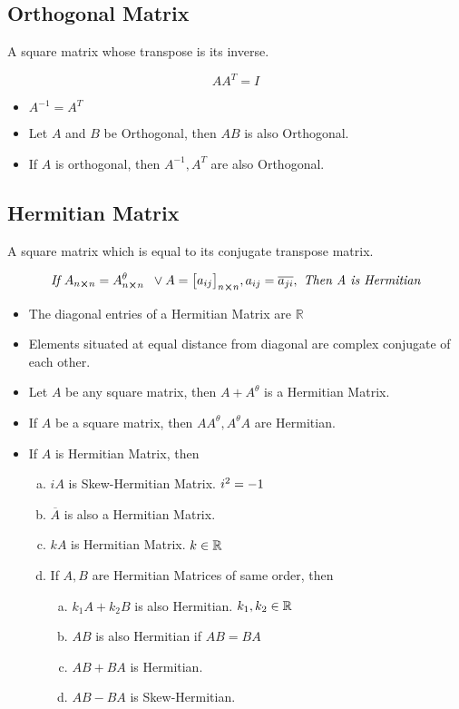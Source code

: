 \documentclass{article}
\begin{document}
\subsection{Orthogonal Matrix}

A square matrix whose transpose is its inverse.

$$AA^{T}=I$$
\begin{itemize}
    \item $A^{-1}=A^T $
    \item Let $A$ and $B$ be Orthogonal, then $AB$ is also Orthogonal.
    \item If $A$ is orthogonal, then $A^{-1}, A^T $ are also Orthogonal.
\end{itemize}

\subsection{Hermitian Matrix}
A square matrix which is equal to its conjugate transpose matrix.

$$\textit{ If } A_{n \cross n}=A_{n \cross n}^\theta \hspace{2mm} \vee A={\begin{bmatrix}
        a_{ij}
    \end{bmatrix}}_{n \cross n}, a_{ij}=\overline{a_{ji}}, \textit{ Then A is Hermitian } $$

\begin{itemize}
    \item The diagonal entries of a Hermitian Matrix are $\mathbb{R}$
    \item Elements situated at equal distance from diagonal are complex conjugate of each other.
    \item Let $A$ be any square matrix, then $A+A^\theta$ is a Hermitian Matrix.
    \item If $A$ be a square matrix, then $AA^\theta, A^\theta A$ are Hermitian.
    \item If $A$ is Hermitian Matrix, then
          \begin{enumerate}[a.]
              \item $iA$ is Skew-Hermitian Matrix. $\hfill i^2=-1$
              \item $\overline{A}$ is also a Hermitian Matrix.
              \item $kA$ is Hermitian Matrix. $\hfill k \in \mathbb{R} $
              \item If $A, B$ are Hermitian Matrices of same order, then
                    \begin{enumerate}[a.]
                        \item $k_{1}A+k_{2}B $ is also Hermitian. $\hfill k_{1}, k_{2} \in \mathbb{R} $
                        \item $AB$ is also Hermitian if $AB=BA$
                        \item $AB+BA$ is Hermitian.
                        \item $AB-BA$ is Skew-Hermitian.
                    \end{enumerate}
          \end{enumerate}
\end{itemize}
\end{document}
